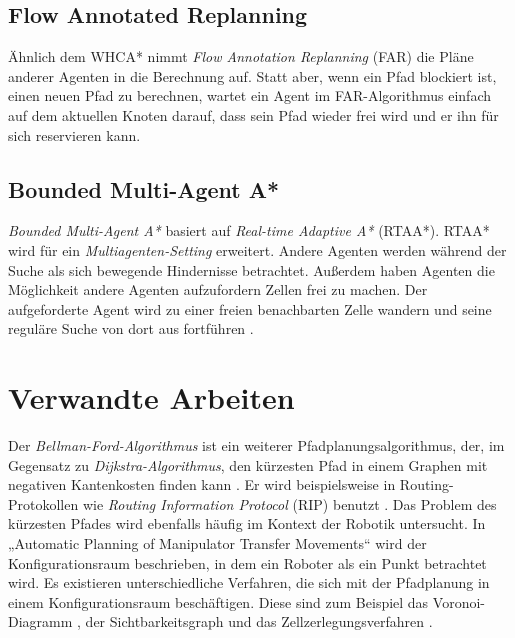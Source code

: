 \subsection{Flow Annotated Replanning}
Ähnlich dem WHCA* nimmt \textit{Flow Annotation Replanning} (FAR) die Pläne anderer Agenten in die Berechnung auf. Statt aber, wenn ein Pfad blockiert ist, einen neuen Pfad zu berechnen, wartet ein Agent im FAR-Algorithmus einfach auf dem aktuellen Knoten darauf, dass sein Pfad wieder frei wird und er ihn für sich reservieren kann.

\subsection{Bounded Multi-Agent A*}
\textit{Bounded Multi-Agent A*} basiert auf \textit{Real-time Adaptive A*} (RTAA*). RTAA* wird für ein \textit{Multiagenten-Setting} erweitert. Andere Agenten werden während der Suche als sich bewegende Hindernisse betrachtet. Außerdem haben Agenten die Möglichkeit andere Agenten aufzufordern Zellen frei zu machen. Der aufgeforderte Agent wird zu einer freien benachbarten Zelle wandern und seine reguläre Suche von dort aus fortführen \cite{Sigurdson.2019}.

\section{Verwandte Arbeiten}

\begin{sloppypar}
	
Der \textit{Bellman-Ford-Algorithmus} ist ein weiterer Pfadplanungsalgorithmus, der, im Gegensatz zu \textit{Dijkstra-Algorithmus}, den kürzesten Pfad in einem Graphen mit negativen Kantenkosten finden kann \cite{Bel58}. Er wird beispielsweise in Routing-Protokollen wie \textit{Routing Information Protocol} (RIP) benutzt \cite{Hed88}.
Das Problem des kürzesten Pfades wird ebenfalls häufig im Kontext der Robotik untersucht. In „Automatic Planning of Manipulator Transfer Movements“ \cite{LP80} wird der Konfigurationsraum beschrieben, in dem ein Roboter als ein Punkt betrachtet wird. Es existieren unterschiedliche Verfahren, die sich mit der Pfadplanung in einem Konfigurationsraum beschäftigen. Diese sind zum Beispiel das Voronoi-Diagramm \cite{Lee82}, der Sichtbarkeitsgraph \cite{LPAW79} und das Zellzerlegungsverfahren \cite{Cai09} .
\end{sloppypar}
